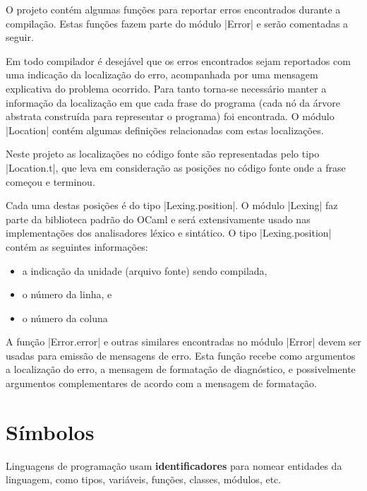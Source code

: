 \documentclass[a4paper,11pt,brazil]{article}
\begin{document}
O projeto contém algumas funções para reportar erros encontrados
durante a compilação. Estas funções fazem parte do módulo
\pyginline|Error| e serão comentadas a seguir.

Em todo compilador é desejável que os erros encontrados sejam
reportados com uma indicação da localização do erro, acompanhada por
uma mensagem explicativa do problema ocorrido. Para tanto torna-se
necessário manter a informação da localização em que cada frase do
programa (cada nó da árvore abstrata construída para representar o
programa) foi encontrada. O módulo \pyginline|Location| contém algumas
definições relacionadas com estas localizações.

Neste projeto as localizações no código fonte são representadas pelo
tipo \pyginline|Location.t|, que leva em consideração as posições no
código fonte onde a frase começou e terminou.

Cada uma destas posições é do tipo \pyginline|Lexing.position|. O
módulo \pyginline|Lexing| faz parte da biblioteca padrão do OCaml e
será extensivamente usado nas implementações dos analisadores léxico e
sintático. O tipo \pyginline|Lexing.position| contém as seguintes
informações:
\begin{itemize}
  \item a indicação da unidade (arquivo fonte) sendo compilada,
  \item o número da linha, e
  \item o número da coluna
\end{itemize}

A função \pyginline|Error.error| e outras similares encontradas no
módulo \pyginline|Error| devem ser usadas para emissão de mensagens de
erro. Esta função recebe como argumentos a localização do erro, a
mensagem de formatação de diagnóstico, e possivelmente argumentos
complementares de acordo com a mensagem de formatação.


\section{Símbolos}

Linguagens de programação usam \textbf{identificadores} para nomear
entidades da linguagem, como tipos, variáveis, funções, classes,
módulos, etc.
\end{document}
